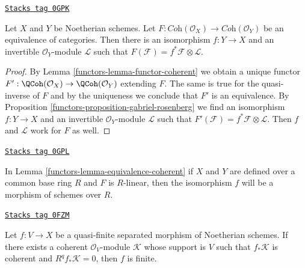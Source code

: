 \begin{lemma}
\label{functors-lemma-equivalence-coherent}
\href{https://stacks.math.columbia.edu/tag/0GPK}{\texttt{Stacks tag 0GPK}}

Let $X$ and $Y$ be Noetherian schemes. Let
$F : \textit{Coh}(\mathcal{O}_X) \to \textit{Coh}(\mathcal{O}_Y)$
be an equivalence of categories. Then there is an isomorphism $f : Y \to X$
and an invertible $\mathcal{O}_Y$-module $\mathcal{L}$
such that $F(\mathcal{F}) = f^*\mathcal{F} \otimes \mathcal{L}$.
\end{lemma}

\begin{proof}

By Lemma \ref{functors-lemma-functor-coherent} we obtain a unique functor
$F' : \QCoh(\mathcal{O}_X) \to \QCoh(\mathcal{O}_Y)$ extending $F$.
The same is true for the quasi-inverse of $F$ and by the uniqueness
we conclude that $F'$ is an equivalence. By
Proposition \ref{functors-proposition-gabriel-rosenberg}
we find an isomorphism $f : Y \to X$
and an invertible $\mathcal{O}_Y$-module $\mathcal{L}$
such that $F'(\mathcal{F}) = f^*\mathcal{F} \otimes \mathcal{L}$.
Then $f$ and $\mathcal{L}$ work for $F$ as well.
\end{proof}

\begin{remark}
\label{functors-remark-equivalence-coherent-linear}
\href{https://stacks.math.columbia.edu/tag/0GPL}{\texttt{Stacks tag 0GPL}}

In Lemma \ref{functors-lemma-equivalence-coherent} if $X$ and $Y$ are defined
over a common base ring $R$ and $F$ is $R$-linear, then the isomorphism
$f$ will be a morphism of schemes over $R$.
\end{remark}

\begin{lemma}
\label{functors-lemma-characterize-finite}
\href{https://stacks.math.columbia.edu/tag/0FZM}{\texttt{Stacks tag 0FZM}}

Let $f : V \to X$ be a quasi-finite separated morphism of Noetherian
schemes. If there exists a coherent $\mathcal{O}_V$-module $\mathcal{K}$
whose support is $V$ such that $f_*\mathcal{K}$ is coherent and
$R^qf_*\mathcal{K} = 0$, then $f$ is finite.
\end{lemma}

